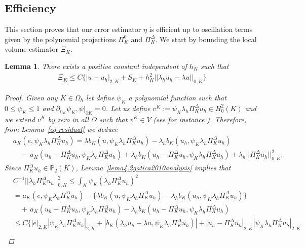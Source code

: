 \documentclass[final,reqno]{elsarticle}
\newtheorem{lemma}{Lemma}[section]
\def\O{\Omega}
\def\PiK{\Pi_{K}^{\Delta}}
\begin{document}
    



\subsection{Efficiency}\label{efficiency}
This section proves that our error estimator $\eta$ is efficient up to oscillation terms given by the polynomial projections $\Pi_K^0$ and $\Pi_K^\Delta$. We start by bounding the local volume estimator $\Xi_K$.
\begin{lemma}\label{R_keffic}
	There exists a positive constant independent of $h_K$ such that
	\begin{align}
		\Xi_K\leq C\Big\{|u-u_h|_{2,K}+S_K+h_K^2||\lambda_h u_h- \lambda u||_{0,K}\Big\}
	\end{align}
	\begin{proof}
		Given any $K\in\Omega_h$ let define $\psi_K$ a polynomial function such that $0\leq \psi_K\leq 1$ and  $ \partial_{n_K}\psi_K,\psi|_{\partial K}=0$. Let us define $v^{K}:=\psi_K\lambda_h\PiK u_h \in H_0^2(K)$ and we extend $v^K$ by zero in all $\O$ such that $v^K\in   V  $ (see for instance \cite[Section~5.3]{chen2022posteriori}). Therefore, from Lemma~\ref{eq-residual} we deduce
		\begin{align}
			&a_K(e,\psi_K \lambda_h\PiK u_h)=\lambda b_K(u,\psi_K\lambda_h\PiK u_h)-\lambda_h b_K(u_h,\psi_K\lambda_h\PiK u_h) \nonumber\\ 
            &\quad - \, a_K(u_h-\PiK u_h,\psi_K\lambda_h \PiK u_h) + \lambda_h  b_K(u_h-\PiK u_h,\psi_K \lambda_h\PiK u_h)+\lambda_h || \PiK u_h||_{0,K}^2.
		\end{align}
		Since $\PiK u_h\in \mathbb{P}_2(K)$,  Lemma~\ref{lema4.2gatica2010analysis} implies that
		\begin{align}
			&C^{-1}||\lambda_h \PiK u_h ||_{0,K}^2\leq \int_K \psi_K (\lambda_h \PiK u_h)^2 \nonumber\\
			&=a_K(e,\psi_K \lambda_h\PiK u_h)-\Big\{\lambda b_K(u,\psi_K\lambda_h\PiK u_h)-\lambda_h b_K(u_h,\psi_K\lambda_h\PiK u_h) \Big\}\nonumber\\
			&\quad + \, a_K(u_h-\PiK u_h,\psi_K\lambda_h \PiK u_h) -\lambda_h  b_K(u_h-\PiK u_h,\psi_K \lambda_h\PiK u_h)\nonumber\\
			&\leq C\Big\{ |e|_{2,K}|\psi_K\lambda_h\PiK u_h|_{2,K}+|b_K(\lambda_hu_h-\lambda u,\psi_K \lambda_h \PiK u_h)| + |u_h-\PiK u_h|_{2,K}|\psi_K \lambda_h \PiK u_h|_{2,K}\nonumber\\

\end{align}
\end{proof}
\end{lemma}
\end{document}

